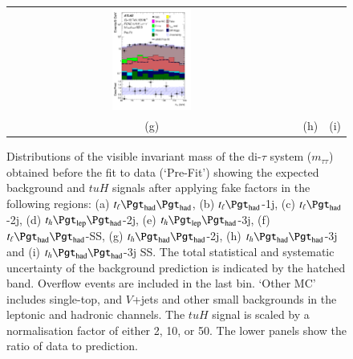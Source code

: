 \begin{figure}[H]
\begin{tabular}{@{}ccc@{}}
\includegraphics[page=1,width=0.28\textwidth]{figures/mtt/tuH_reg2mtau1b3jss_log_mtt.pdf}\\
(g) & (h) & (i)\\
\end{tabular}
\caption{Distributions of the visible invariant mass of the di-$\tau$ system ($m_{\tau\tau}$) obtained before the fit to data (`Pre-Fit') showing 
  the expected background and $tuH$ signals after applying fake factors in the following regions: (a) $t_{\ell}\thadhad$,
 (b) $t_{\ell}\tauhad$-1j,  (c) $t_{\ell}\tauhad$-2j, (d) $t_h\tlhad$-2j, (e) $t_h\tlhad$-3j, (f) $t_{\ell}\thadhad$-SS, (g) $t_h\thadhad$-2j, (h) $t_h\thadhad$-3j and (i) $t_h\thadhad$-3j SS.
 The total statistical and systematic uncertainty of the background prediction is indicated by the hatched band.
 Overflow events are included in the last bin. `Other MC' includes single-top, and $V$+jets and other small backgrounds in the leptonic and hadronic channels. The $tuH$ signal is scaled by a normalisation factor of either 2, 10, or 50.   
The lower panels show the ratio of data to prediction.}
\label{fig:mtt}
\end{figure}


